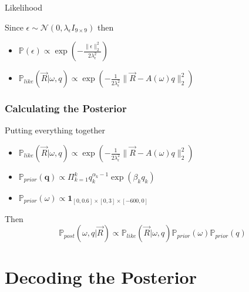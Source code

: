 \documentclass[11pt]{beamer}
\theoremstyle{plain}
\theoremstyle{definition}
\newcommand{\p}{\mathbb{P}}
\newcommand{\like}{\p_{like}}
\newcommand{\prior}{\p_{prior}}
\newcommand{\post}{\p_{post}}
\newcommand{\q}{\textbf{q}}
\begin{document}
\begin{frame}{Likelihood}


Since $\epsilon\sim\mathcal{N}(0,\lambda_{\epsilon}I_{9\times 9})$ then

\begin{itemize}
\item $\p(\epsilon)\propto\exp\left(-\frac{\|\epsilon\|_{2}^{2}}{2\lambda_{\epsilon}^{2}}\right)$
\item $\like(\vec{R}|\omega,q)\propto
\exp\left(-\frac{1}{2\lambda_{\epsilon}^{2}}\|\vec{R}-A(\omega)q\|^{2}_{2}\right)$
\end{itemize}
\end{frame}

\begin{frame}
\frametitle{Calculating the Posterior}
Putting everything together
\begin{itemize}
\item $\like(\vec{R}|\omega,q)\propto
\exp\left(-\frac{1}{2\lambda_{\epsilon}^{2}}\|\vec{R}-A(\omega)q\|^{2}_{2}\right)$
\item $\prior(\q)\propto \Pi_{k=1}^{k}q_{k}^{\alpha_{k}-1}\exp(\beta_{k}q_{k})$
\item $\prior(\omega)\propto\textbf{1}_{[0,0.6]\times[0,3]\times[-600,0]}$
\end{itemize}
\bigskip
Then
\begin{equation*}
\post(\omega,q|\vec{R})\propto\like(\vec{R}|\omega,q)\prior(\omega)\prior(q)
\end{equation*}
\end{frame}




\section{Decoding the Posterior}
\end{document}
